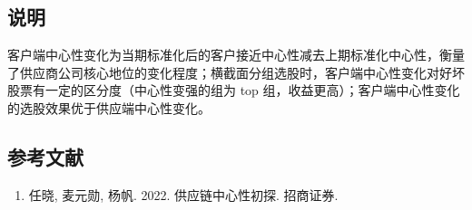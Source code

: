 \documentclass{article}
\begin{document}
\subsection{说明}
客户端中心性变化为当期标准化后的客户接近中心性减去上期标准化中心性，衡量了供应商公司核心地位的变化程度；横截面分组选股时，客户端中心性变化对好坏股票有一定的区分度（中心性变强的组为 top 组，收益更高）；客户端中心性变化的选股效果优于供应端中心性变化。

\subsection{参考文献}
\begin{enumerate}
    \item 任晓, 麦元勋, 杨帆. 2022. 供应链中心性初探. 招商证券.
\end{enumerate}
\end{document}
